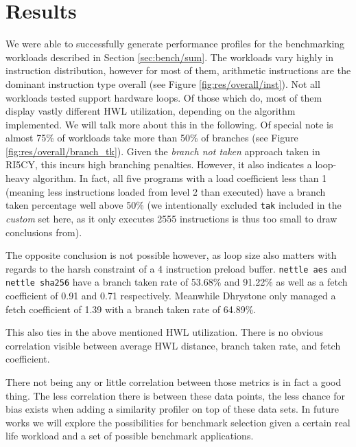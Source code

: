 \documentclass[../bachelor_paper.tex]{subfiles}
\begin{document}
\chapter{Results}
    \label{ch:res}
    
We were able to successfully generate performance profiles for the benchmarking workloads described in Section \ref{sec:bench/sum}. The workloads vary highly in instruction distribution, however for most of them, arithmetic instructions are the dominant instruction type overall (see Figure \ref{fig:res/overall/inst}). Not all workloads tested support hardware loops. Of those which do, most of them display vastly different \ac{HWL} utilization, depending on the algorithm implemented. We will talk more about this in the following. Of special note is almost 75\% of workloads take more than 50\% of branches (see Figure \ref{fig:res/overall/branch_tk}). Given the \emph{branch not taken} approach taken in RI5CY, this incurs high branching penalties. However, it also indicates a loop-heavy algorithm. In fact, all five programs with a load coefficient less than 1 (meaning less instructions loaded from level 2 than executed) have a branch taken percentage well above 50\% (we intentionally excluded \texttt{tak} included in the \emph{custom} set here, as it only executes 2555 instructions is thus too small to draw conclusions from). 

The opposite conclusion is not possible however, as loop size also matters with regards to the harsh constraint of a 4 instruction preload buffer. \texttt{nettle aes} and \texttt{nettle sha256} have a branch taken rate of 53.68\% and 91.22\% as well as a fetch coefficient of 0.91 and 0.71 respectively. Meanwhile Dhrystone only managed a fetch coefficient of 1.39 with a branch taken rate of 64.89\%. 

This also ties in the above mentioned \ac{HWL} utilization. There is no obvious correlation visible between average \ac{HWL} distance, branch taken rate, and fetch coefficient.

There not being any or little correlation between those metrics is in fact a good thing. The less correlation there is between these data points, the less chance for bias exists when adding a similarity profiler on top of these data sets. In future works we will explore the possibilities for benchmark selection given a certain real life workload and a set of possible benchmark applications.
\end{document}
